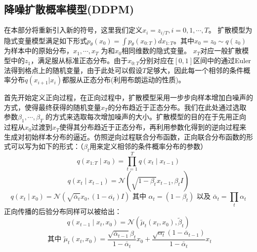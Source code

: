 \subsection{降噪扩散概率模型(DDPM)}
在本部分将重新引入新的符号，这里我们定义$x_i= z_{i/T},i=0,1,\cdots,T$。
扩散模型为隐式变量模型满足如下形式$p_{\theta}(x_0) = \int p_{\theta}(x_{0:T}) dx_{1:T}$。其中$x_0=z_0\sim q(z_0)$为样本中的原始分布，$x_1,\cdots, x_{T}$ 为和$x_0$相同维数的隐式变量。 $x_T$对应一般扩散模型中的$z_1$，满足服从标准正态分布。由于$x_{0:T}$分别对应在$[0,1]$区间中的通过Euler法得到格点上的随机变量，由于此处可以假设$T$足够大，因此每一个相邻的条件概率分布$q(x_{i+1}|x_i)$都服从正态分布(利用布朗运动的性质)。\par 
首先开始定义正向过程，在正向过程中，扩散模型采用一步步向样本增加白噪声的方式，使得最终获得的随机变量$x_T$的分布趋近于正态分布。我们在此处通过选取参数$\beta_1, \cdots, \beta_{T}$ 的方式来选取每次增加噪声的大小。扩散模型的目的在于先用正向过程从$x_0$过渡到$x_T$使得其分布趋近于正态分布，再利用参数化得到的逆向过程来生成对初始样本分布的逼近。仿照逆向过程联合分布函数，正向联合分布函数的形式可以写为如下的形式：（$\beta_t$用来定义相邻的条件概率分布的参数）
\begin{equation}
    q\left(x_{1: T} \mid x_0\right)=\prod_{t=1}^T q\left(x_t \mid x_{t-1}\right)
    \end{equation}
    \begin{equation}
        q\left(x_t \mid x_{t-1}\right)=\mathcal{N}\left(\sqrt{1-\beta_t} x_{t-1}, \beta_t I\right)
        \end{equation}
        \begin{equation}
            q\left(x_t \mid x_0\right)=\mathcal{N}\left(\sqrt{\bar{\alpha}_t} x_0,\left(1-\overline{\alpha_t}\right) I\right) \text { 其中 } \alpha_t=\left(1-\beta_t\right) \text { 以及 } \bar{\alpha}_t=\prod_t \alpha_t
            \label{posterior of xt}
            \end{equation}
    正向传播的后验分布同样可以被给出：
    \begin{equation}
        q\left(x_{t-1} \mid x_t, x_0\right)=\mathcal{N}\left(\tilde{\mu}_t\left(x_t, x_0\right), \tilde{\beta}_t\right)
        \label{posterior xt 2}
        \end{equation}
        \begin{equation}
            \text {     其中 } \tilde{\mu}_t\left(x_t, x_0\right)=\frac{\sqrt{\bar{\alpha}_{t-1}} \beta_t}{1-\bar{\alpha}_t} x_0+\frac{\sqrt{\alpha_t}\left(1-\bar{\alpha}_{t-1}\right)}{1-\bar{\alpha}_t} x_t
            \end{equation}
